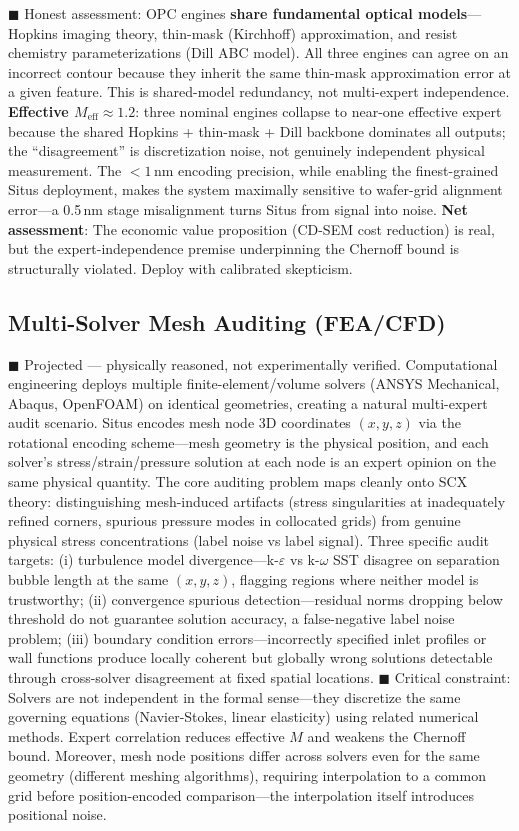 \documentclass[12pt,a4paper]{article}
\begin{document}
\textcolor{warning}{$\blacksquare$ Honest assessment}: OPC engines \textbf{share fundamental optical models}—Hopkins imaging theory, thin-mask (Kirchhoff) approximation, and resist chemistry parameterizations (Dill ABC model). All three engines can agree on an incorrect contour because they inherit the same thin-mask approximation error at a given feature. This is shared-model redundancy, not multi-expert independence. \textbf{Effective $M_{\text{eff}} \approx 1.2$}: three nominal engines collapse to near-one effective expert because the shared Hopkins + thin-mask + Dill backbone dominates all outputs; the ``disagreement'' is discretization noise, not genuinely independent physical measurement. The $<1$\,nm encoding precision, while enabling the finest-grained Situs deployment, makes the system maximally sensitive to wafer-grid alignment error—a 0.5\,nm stage misalignment turns Situs from signal into noise. \textbf{Net assessment}: The economic value proposition (CD-SEM cost reduction) is real, but the expert-independence premise underpinning the Chernoff bound is structurally violated. Deploy with calibrated skepticism.

\subsection{Multi-Solver Mesh Auditing (FEA/CFD)}

\textcolor{projected}{$\blacksquare$ Projected — physically reasoned, not experimentally verified.}
Computational engineering deploys multiple finite-element/volume solvers (ANSYS Mechanical, Abaqus, OpenFOAM) on identical geometries, creating a natural multi-expert audit scenario. Situs encodes mesh node 3D coordinates $(x,y,z)$ via the rotational encoding scheme—mesh geometry is the physical position, and each solver's stress/strain/pressure solution at each node is an expert opinion on the same physical quantity. The core auditing problem maps cleanly onto SCX theory: distinguishing mesh-induced artifacts\cite{roache1997,oberkampf2002} (stress singularities at inadequately refined corners, spurious pressure modes in collocated grids) from genuine physical stress concentrations (label noise vs label signal). Three specific audit targets: (i) turbulence model divergence—k-$\varepsilon$ vs k-$\omega$ SST disagree on separation bubble length at the same $(x,y,z)$, flagging regions where neither model is trustworthy; (ii) convergence spurious detection—residual norms dropping below threshold do not guarantee solution accuracy, a false-negative label noise problem; (iii) boundary condition errors—incorrectly specified inlet profiles or wall functions produce locally coherent but globally wrong solutions detectable through cross-solver disagreement at fixed spatial locations. \textcolor{warning}{$\blacksquare$ Critical constraint}: Solvers are not independent in the formal sense—they discretize the same governing equations (Navier-Stokes, linear elasticity) using related numerical methods. Expert correlation reduces effective $M$ and weakens the Chernoff bound. Moreover, mesh node positions differ across solvers even for the same geometry (different meshing algorithms), requiring interpolation to a common grid before position-encoded comparison—the interpolation itself introduces positional noise.
\end{document}
